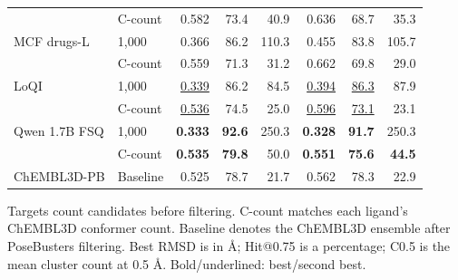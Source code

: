 \begin{table}[htbp]
\begin{tabular*}{\linewidth}{@{\extracolsep{\fill}}llrrr@{\hspace{8pt}}rrr@{}}
\rowcolor{tableShade}
 & C-count & 0.582 & 73.4 & 40.9 & 0.636 & 68.7 & 35.3 \\
\addlinespace[2pt]
MCF drugs-L & 1,000 & 0.366 & 86.2 & 110.3 & 0.455 & 83.8 & 105.7 \\
 & C-count & 0.559 & 71.3 & 31.2 & 0.662 & 69.8 & 29.0 \\
\addlinespace[2pt]
\rowcolor{tableShade}
LoQI & 1,000 & \underline{0.339} & 86.2 & 84.5 & \underline{0.394} & \underline{86.3} & 87.9 \\
\rowcolor{tableShade}
 & C-count & \underline{0.536} & 74.5 & 25.0 & \underline{0.596} & \underline{73.1} & 23.1 \\
\addlinespace[2pt]
Qwen 1.7B FSQ & 1,000 & \textbf{0.333} & \textbf{92.6} & 250.3 & \textbf{0.328} & \textbf{91.7} & 250.3 \\
 & C-count & \textbf{0.535} & \textbf{79.8} & 50.0 & \textbf{0.551} & \textbf{75.6} & \textbf{44.5} \\
\addlinespace[2pt]
\hdashline
ChEMBL3D-PB & Baseline & 0.525 & 78.7 & 21.7 & 0.562 & 78.3 & 22.9 \\
\bottomrule
\end{tabular*}
\par\smallskip
\begin{minipage}{\linewidth}
Targets count candidates before filtering. C-count matches each ligand's ChEMBL3D conformer count. Baseline denotes the ChEMBL3D ensemble after PoseBusters filtering. Best RMSD is in \AA{}; Hit@0.75 is a percentage; C0.5 is the mean cluster count at 0.5 \AA{}. Bold/underlined: best/second best.
\end{minipage}
\end{table}
